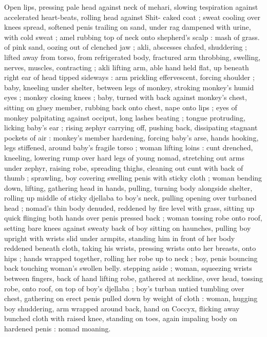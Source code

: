 Open lips, pressing pale head against neck of mehari, slowing 
tespiration against accelerated heart-beats, rolling head against 
Shit- caked coat ; sweat cooling over knees spread, softened penis 
trailing on sand, under rag dampened with urine, with cold sweat ; 
amel rubbing top of neck onto shepherd's scalp : mash of grass. of 
pink sand, oozing out of clenched jaw ; akli, abscesses chafed, 
shuddering ; lifted away from torso, from refrigerated body, fractured 
arm throbbing, swelling, nerves, muscles, contracting ; akli lifting 
arm, able hand held flat, up beneath right ear of head tipped 
sideways : arm prickling effervescent, forcing shoulder ; baby, 
kneeling under shelter, between legs of monkey, stroking monkey's 
humid eyes ; monkey closing knees ; baby, turned with back against 
monkey's chest, sitting on gluey member, rubbing back onto chest, 
nape onto lips ; eyes of monkey palpitating against occiput, long 
lashes beating ; tongue protruding, licking baby's ear ; rising zephyr 
carrying off, pushing back, dissipating stagnant pockets of air : 
monkey's member hardening, forcing baby's arse, hands hooking, 
legs stiffened, around baby's fragile torso ; woman lifting loins : cunt 
drenched, kneeling, lowering rump over hard legs of young nomad, 
stretching out arms under zephyr, raising robe, spreading thighs, 
cleaning out cunt with back of thumb ; sprawling, boy covering 
swelling penis with sticky cloth ; woman bending down, lifting, 
gathering head in hands, pulling, turning body alongside shelter, 
rolling up middle of sticky djellaba to boy's neck, pulling opening 
over turbaned head ; nomad's thin body denuded, reddened by fire 
level with grass, sitting up quick flinging both hands over penis 
pressed back ; woman tossing robe onto roof, setting bare knees 
against sweaty back of boy sitting on haunches, pulling boy upright 
with wrists slid under armpits, standing him in front of her body 
reddened beneath cloth, taking his wrists, pressing wrists onto her 
breasts, onto hips ; hands wrapped together, rolling her robe up to 
neck ; boy, penis bouncing back touching woman's swollen belly. 
stepping aside ; woman, squeezing wrists between fingers, back of 
hand lifting robe, gathered at neckline, over head, tossing robe, onto 
roof, on top of boy's djellaba ; boy's turban untied tumbling over 
chest, gathering on erect penis pulled down by weight of cloth : 
woman, hugging boy shuddering, arm wrapped around back, hand on 
Coccyx, flicking away bunched cloth with raised knee, standing on 
toes, again impaling body on hardened penis : nomad moaning. 
